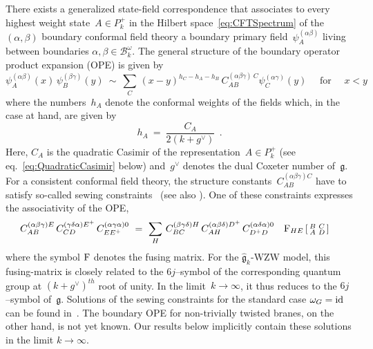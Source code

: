 \documentclass[12pt,a4paper]{article}
\newcommand{\mf}{\mathfrak} %
\newcommand{\mc}{\mathcal} %
\def\bL{\mc{B}} %
\def\areps{P_k^+} %
\def\tareps{\bL^\omega_k} %
\def\tF{{\rm F}}
\def\asg{{\hat{\mf{g}}}}
\def\id{{\rm id}}
\def\a{\alpha}
\def\b{\beta}
\begin{document}
There exists a generalized state-field correspondence that 
associates to every highest weight state~$A\in\areps$ in 
the Hilbert space~\eqref{eq:CFTSpectrum} of the $(\alpha,\beta)$
boundary conformal field theory a boundary 
primary field~$\psi_A^{(\a\b)}$ living between boundaries
$\alpha,\beta\in\tareps$. The general structure of the 
boundary operator product expansion (OPE) is given by
\begin{equation}
  \label{eq:BOPE}
  \psi_A^{(\alpha\beta)}(x)\, \psi_B^{(\beta\gamma)}(y)
  \ \sim\ \sum_{C}\, (x-y)^{h_C-h_A-h_B}
    \, C_{AB}^{(\alpha\beta\gamma)\:C}\psi_C^{(\alpha\gamma)}(y)
  \quad\text{ for }\quad x<y
\end{equation}
where the numbers~$h_A$ denote the conformal weights of the
fields which, in the case at hand, are given by
\begin{equation}
  \label{eq:ConformalWeights}
  h_A\ =\ \frac{C_A}{2(k+g^\vee)}\ \ .
\end{equation}
Here, $C_A$ is the quadratic Casimir of the representation~$A\in\areps$
(see eq.~\eqref{eq:QuadraticCasimir} below) and~$g^\vee$ denotes the
dual Coxeter number of~$\mf{g}$. For a consistent conformal 
field theory, the 
structure constants~$C_{AB}^{(\alpha\beta\gamma)C}$ have to 
satisfy so-called sewing constraints~\cite{Lewellen:1992tb}
(see also \cite{Pradisi:1996yd,Runkel:1998pm,Runkel:1999dz}). 
One of these constraints expresses the associativity of the OPE, 
\begin{equation}
  \label{eq:SewingConstraints}
  C_{AB}^{(\alpha\beta\gamma)E}\, C_{CD}^{(\gamma\delta\alpha)E^+}
  \, C_{EE^+}^{(\alpha\gamma\alpha)0}
  \ =\ \sum_H\,  C_{BC}^{(\beta\gamma\delta)H}\, 
  C_{AH}^{(\alpha\beta\delta)D^+}\, C_{D^+D}^{(\alpha\delta\alpha)0}
  \quad\tF_{HE}\left[\begin{smallmatrix}B&C\\A&D\end{smallmatrix}
\right]\quad
\end{equation}
where the symbol ${\rm F}$ denotes the fusing matrix. For
the $\asg_k$-WZW model, this fusing-matrix is closely related 
to the $6j$--symbol of the corresponding quantum group at 
$(k+g^\vee)^{th}$ root of unity. In the limit~$k\to\infty$, it 
thus reduces to the $6j$--symbol of~$\mf{g}$. Solutions of 
the sewing constraints for the standard case $\omega_G = \id$ 
can be found in~\cite{Runkel:1998pm, Alekseev:1999bs, Felder:1999ka, 
Behrend:1999bn}. The boundary OPE for non-trivially twisted 
branes, on the other hand, is not yet known. Our results
below implicitly contain these solutions in the limit 
$k \rightarrow \infty$.  
\medskip
\end{document}
